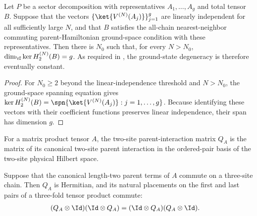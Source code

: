 \begin{lemma}%
    \label{thm:nncph_eventual_ground_space_dimension}
    \leanok
    Let $P$ be a sector decomposition with representatives
    $A_1,\ldots,A_g$ and total tensor $B$. Suppose that the vectors
    $\{\ket{V^{(N)}(A_j)}\}_{j=1}^g$ are linearly independent for all
    sufficiently large $N$, and that $B$ satisfies the all-chain
    nearest-neighbor commuting parent-Hamiltonian ground-space condition with
    these representatives. Then there is $N_0$ such that, for every $N>N_0$,
    $\dim_{\C}\ker H_2^{(N)}(B) = g$.
    As required in \cite[Section~IV]{Beigi2012Classification}, the
    ground-state degeneracy is therefore eventually constant.
\end{lemma}

\begin{proof}\leanok
    For $N_0\geq2$ beyond the linear-independence threshold and $N>N_0$,
    the ground-space spanning equation gives
    $\ker H_2^{(N)}(B) = \spn\{\ket{V^{(N)}(A_j)}:j=1,\ldots,g\}$.
    Because identifying these vectors with their coefficient functions preserves
    linear independence, their span has dimension $g$.
\end{proof}

\begin{definition}%
    \label{def:two_site_parent_interaction_matrix}
    \leanok
    For a matrix product tensor $A$, the two-site parent-interaction matrix
    $Q_A$ is the matrix of its canonical two-site parent interaction in the
    ordered-pair basis of the two-site physical Hilbert space.
\end{definition}

\begin{lemma}%
    \label{thm:two_site_parent_interaction_commuting_overlaps}
    \leanok
    Suppose that the canonical length-two parent terms of $A$ commute on a
    three-site chain. Then $Q_A$ is Hermitian, and its natural placements on
    the first and last pairs of a three-fold tensor product commute:
    \begin{align}
        (Q_A\otimes\Id)(\Id\otimes Q_A)
         & =
        (\Id\otimes Q_A)(Q_A\otimes\Id).
        \notag
    \end{align}
\end{lemma}

